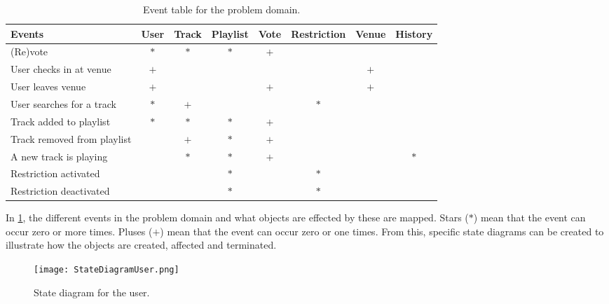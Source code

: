\begin{table}[htbp]
    \centering
    \tabcolsep=0.10cm
    \begin{tabular}{lccccccc}
        \toprule
        \textbf{Events}                 & User   & Track  & Playlist & Vote   & Restriction & Venue  & History\\
        \midrule
        (Re)vote                        & $\ast$ & $\ast$ &   $\ast$ &   $+$  &             &        &        \\
        User checks in at venue         & $+$    &        &          &        &             & $+$    &        \\
        User leaves venue               & $+$    &        &          &  $+$   &             & $+$    &        \\
        User searches for a track       & $\ast$ &  $+$   &          &        & $\ast$      &        &        \\
        Track added to playlist         & $\ast$ & $\ast$ & $\ast$   & $+$    &             &        &        \\
        Track removed from playlist     &        & $+$    & $\ast$   & $+$    &             &        &        \\
        A new track is playing          &        & $\ast$ & $\ast$   & $+$    &             &        & $\ast$ \\
        Restriction activated           &        &        & $\ast$   &        & $\ast$      &        &        \\
        Restriction deactivated         &        &        & $\ast$   &        & $\ast$      &        &        \\
        \bottomrule
    \end{tabular}
    \caption{Event table for the problem domain.}\label{eventtable}
\end{table}

In \cref{eventtable}, the different events in the problem domain and
what objects are effected by these are mapped. Stars ($\ast$) mean that the
event can occur zero or more times. Pluses ($+$) mean that the event can
occur zero or one times. From this, specific state diagrams can be created to illustrate how the objects are created, affected and terminated.

\begin{figure}[H]
  \centering
  \texttt{[image: StateDiagramUser.png]}
  \caption{State diagram for the user.}\label{fig:StateDiagramUser}
\end{figure}

